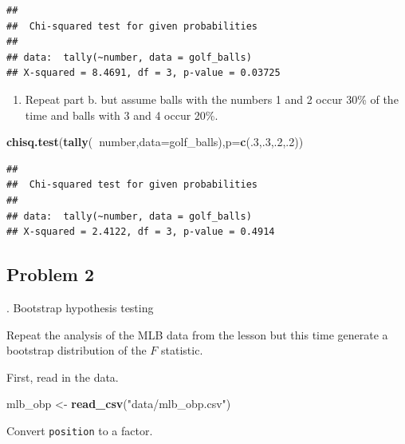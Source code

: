\documentclass[
]{book}
\newenvironment{Shaded}{\begin{snugshade}}{\end{snugshade}}
\newcommand{\DataTypeTok}[1]{\textcolor[rgb]{0.13,0.29,0.53}{#1}}
\newcommand{\DecValTok}[1]{\textcolor[rgb]{0.00,0.00,0.81}{#1}}
\newcommand{\KeywordTok}[1]{\textcolor[rgb]{0.13,0.29,0.53}{\textbf{#1}}}
\newcommand{\NormalTok}[1]{#1}
\newcommand{\OperatorTok}[1]{\textcolor[rgb]{0.81,0.36,0.00}{\textbf{#1}}}
\newcommand{\StringTok}[1]{\textcolor[rgb]{0.31,0.60,0.02}{#1}}
\providecommand{\tightlist}{%
  \setlength{\itemsep}{0pt}\setlength{\parskip}{0pt}}
\begin{document}
\begin{verbatim}
## 
##  Chi-squared test for given probabilities
## 
## data:  tally(~number, data = golf_balls)
## X-squared = 8.4691, df = 3, p-value = 0.03725
\end{verbatim}

\begin{enumerate}
\def\labelenumi{\alph{enumi}.}
\setcounter{enumi}{2}
\tightlist
\item
  Repeat part b. but assume balls with the numbers 1 and 2 occur 30\% of the time and balls with 3 and 4 occur 20\%.
\end{enumerate}

\begin{Shaded}
\begin{Highlighting}[]
\KeywordTok{chisq.test}\NormalTok{(}\KeywordTok{tally}\NormalTok{(}\OperatorTok{~}\NormalTok{number,}\DataTypeTok{data=}\NormalTok{golf_balls),}\DataTypeTok{p=}\KeywordTok{c}\NormalTok{(.}\DecValTok{3}\NormalTok{,.}\DecValTok{3}\NormalTok{,.}\DecValTok{2}\NormalTok{,.}\DecValTok{2}\NormalTok{))}
\end{Highlighting}
\end{Shaded}

\begin{verbatim}
## 
##  Chi-squared test for given probabilities
## 
## data:  tally(~number, data = golf_balls)
## X-squared = 2.4122, df = 3, p-value = 0.4914
\end{verbatim}

\hypertarget{problem-2-23}{%
\subsection{Problem 2}\label{problem-2-23}}

. Bootstrap hypothesis testing

Repeat the analysis of the MLB data from the lesson but this time generate a bootstrap distribution of the \(F\) statistic.

First, read in the data.

\begin{Shaded}
\begin{Highlighting}[]
\NormalTok{mlb_obp <-}\StringTok{ }\KeywordTok{read_csv}\NormalTok{(}\StringTok{"data/mlb_obp.csv"}\NormalTok{)}
\end{Highlighting}
\end{Shaded}

Convert \texttt{position} to a factor.

\begin{Shaded}
\end{Shaded}
\end{document}

